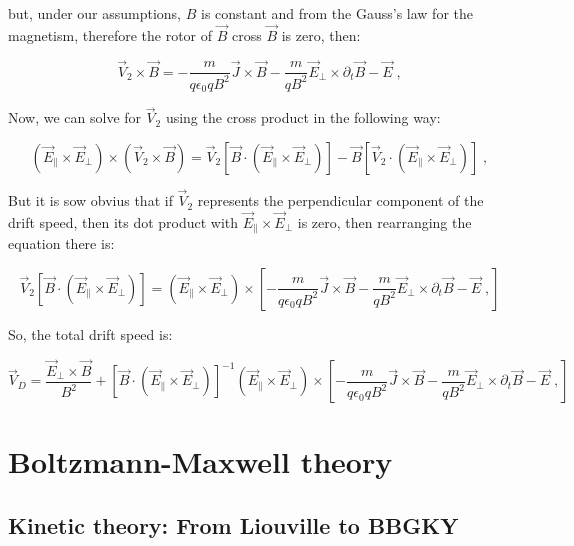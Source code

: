 \documentclass[spanish,notitlepage,letterpaper,11pt]{article} %
\numberwithin{equation}{subsection}
\begin{document}
    but, under our assumptions, $B$ is constant and from the Gauss's law for the magnetism, therefore the rotor of $\Vec{B}$ cross $\Vec{B}$ is zero, then:

    \begin{equation}
        \Vec{V}_2\times\Vec{B} = -\frac{m}{q\epsilon_0qB^2}\Vec{J}\times\Vec{B} - \frac{m}{qB^2}\Vec{E}_\perp \times \partial_t\Vec{B} - \Vec{E}\;,
    \end{equation}

    Now, we can solve for $\Vec{V}_2$ using the cross product in the following way:

    \begin{equation}
        (\Vec{E}_\parallel \times \Vec{E}_\perp) \times (\Vec{V}_2 \times \Vec{B}) = \Vec{V}_2\left[\Vec{B}\cdot(\Vec{E}_\parallel \times \Vec{E}_\perp)\right] - \Vec{B}\left[\Vec{V}_2 \cdot (\Vec{E}_\parallel \times \Vec{E}_\perp) \right]\;,
    \end{equation}

    But it is sow obvius that if $\Vec{V}_2$ represents the perpendicular component of the drift speed, then its dot product with $\Vec{E}_\parallel \times \Vec{E}_\perp$ is zero, then rearranging the equation there is:

    \begin{equation}
        \Vec{V}_2\left[\Vec{B}\cdot(\Vec{E}_\parallel \times \Vec{E}_\perp)\right] = (\Vec{E}_\parallel \times \Vec{E}_\perp) \times \left[-\frac{m}{q\epsilon_0qB^2}\Vec{J}\times\Vec{B} - \frac{m}{qB^2}\Vec{E}_\perp \times \partial_t\Vec{B} - \Vec{E}\;, \right]
    \end{equation}

    So, the total drift speed is:

    \begin{equation}
        \Vec{V}_D = \frac{\Vec{E}_\perp \times \Vec{B}}{B^2} + \left[\Vec{B}\cdot(\Vec{E}_\parallel \times \Vec{E}_\perp)\right]^{-1}(\Vec{E}_\parallel \times \Vec{E}_\perp) \times \left[-\frac{m}{q\epsilon_0qB^2}\Vec{J}\times\Vec{B} - \frac{m}{qB^2}\Vec{E}_\perp \times \partial_t\Vec{B} - \Vec{E}\;, \right]
    \end{equation}
    
    \section{Boltzmann-Maxwell theory}
    
    \subsection{Kinetic theory: From Liouville to BBGKY}
\end{document}
